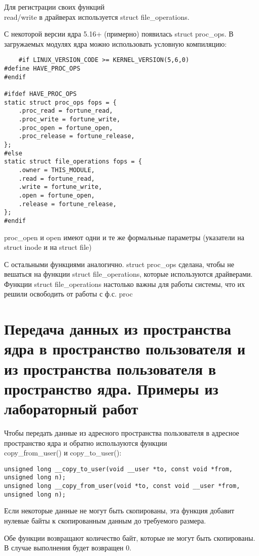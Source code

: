 Для регистрации своих функций \\ read/write в драйверах используется struct file\_operations.

С некоторой версии ядра 5.16+ (примерно) появилась struct proc\_ops. В загружаемых модулях ядра можно использовать условную компиляцию:

\begin{lstlisting}
    #if LINUX_VERSION_CODE >= KERNEL_VERSION(5,6,0)
#define HAVE_PROC_OPS
#endif

#ifdef HAVE_PROC_OPS
static struct proc_ops fops = {
    .proc_read = fortune_read,
    .proc_write = fortune_write,
    .proc_open = fortune_open,
    .proc_release = fortune_release,
};
#else
static struct file_operations fops = {
    .owner = THIS_MODULE,
    .read = fortune_read,
    .write = fortune_write,
    .open = fortune_open,
    .release = fortune_release,
};
#endif
\end{lstlisting}

proc\_open и open имеют одни и те же формальные параметры (указатели на struct inode и на struct file)

С остальными функциями аналогично. struct proc\_ops сделана, чтобы не вешаться на функции struct file\_operations, которые используются драйверами. Функции struct file\_operations настолько важны для работы системы, что их решили освободить от работы с ф.с. proc 

\section{Передача данных из пространства ядра в пространство пользователя и из пространства пользователя в пространство ядра. Примеры из лабораторный работ}
Чтобы передать данные из адресного пространства пользователя в адресное пространство ядра и обратно используются функции \\ copy\_from\_user() и copy\_to\_user():

\begin{lstlisting}
unsigned long __copy_to_user(void __user *to, const void *from, unsigned long n);
unsigned long __copy_from_user(void *to, const void __user *from, unsigned long n);
\end{lstlisting}

Если некоторые данные не могут быть скопированы, эта функция добавит нулевые байты к скопированным данным до требуемого размера.

Обе функции возвращают количество байт, которые не могут быть скопированы. В случае выполнения будет возвращен 0.

